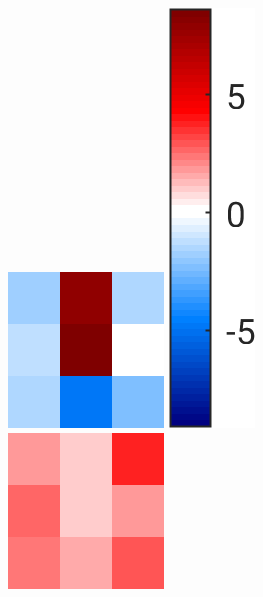 \documentclass[10pt,twoside]{book}
\begin{document}
\begin{figure}
\begin{subfigure}{0.31\textwidth}
    \includegraphics[height=0.77\textwidth]{scenario4_training_filterWeights_1}
    \includegraphics[height=0.77\textwidth]{scenario4_training_filterWeights_colorbar}
    \includegraphics[height=0.77\textwidth]{scenario4_training_filterWeights_2}

\end{subfigure}
\end{figure}
\end{document}
